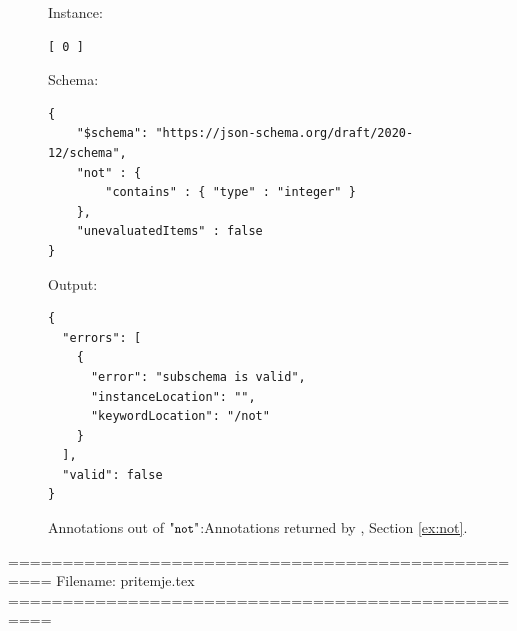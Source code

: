 \begin{figure}
\small

Instance:
\begin{querybox}{}
\begin{lstlisting}[style=querynonumbers]
[ 0 ]
\end{lstlisting}
\end{querybox}


Schema:
\begin{querybox}{}
\begin{lstlisting}[style=query]
{
	"$schema": "https://json-schema.org/draft/2020-12/schema",
	"not" : {
	    "contains" : { "type" : "integer" }
	},
	"unevaluatedItems" : false
}
\end{lstlisting}
\end{querybox}
 
Output:
\begin{querybox}{}
\begin{lstlisting}[style=query]
{
  "errors": [
    {
      "error": "subschema is valid",
      "instanceLocation": "",
      "keywordLocation": "/not"
    }
  ],
  "valid": false
}
\end{lstlisting}
\end{querybox}

\caption{Annotations out of $\qnot$:Annotations returned by {\KE}, Section \ref{ex:not}.}
\label{fig:notjs}
\end{figure}



==================================================
Filename: pritemje.tex
==================================================


